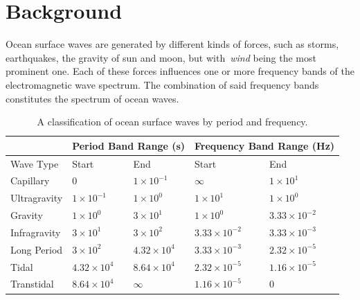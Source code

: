 

\renewcommand{\Re}{\mathcal{R}}
\renewcommand{\Im}{\mathcal{I}} 
%
\chapter{Background}
\label{ch:background}
%
Ocean surface waves are generated by different kinds of forces, such as 
storms, earthquakes, the gravity of sun and moon, but with~\emph{wind} being
the most prominent one. Each of these forces influences one or more frequency
bands of the electromagnetic wave spectrum. The combination of said frequency
bands constitutes the spectrum of ocean waves.
%
\begin{table}[h]
\begin{tabularx}{\textwidth}{X | X X | X X }
  \cline{2-5}
  & \multicolumn{2}{c}{Period Band Range (\si{\second})} \vline & \multicolumn{2}{c}{Frequency Band Range (\si{\hertz})} \\
  \hline
  Wave Type & Start & End & Start & End \\
 \hline
  Capillary    & $0$                & $1\times10^{-1}$   & $\infty$            & $1\times10^1$ \\
  Ultragravity & $1\times10^{-1}$   & $1\times10^{0}$    & $1\times10^1$       & $1\times10^0$ \\
  Gravity      & $1\times10^{0}$    & $3\times10^{1}$    & $1\times10^0$       & $3.33\times10^{-2}$ \\
  Infragravity & $3\times10^{1}$    & $3\times10^{2}$    & $3.33\times10^{-2}$ & $3.33\times10^{-3}$ \\
  Long Period  & $3\times10^{2}$    & $4.32\times10^{4}$ & $3.33\times10^{-3}$ & $2.32\times10^{-5}$ \\
  Tidal        & $4.32\times10^{4}$ & $8.64\times10^{4}$ & $2.32\times10^{-5}$ & $1.16\times10^{-5}$ \\
  Transtidal   & $8.64\times10^{4}$ & $\infty$           & $1.16\times10^{-5}$ & $0$
\end{tabularx}
\caption{A classification of ocean surface waves by period and frequency.}
\label{tab:ocean_wave_period}
\end{table}
%

